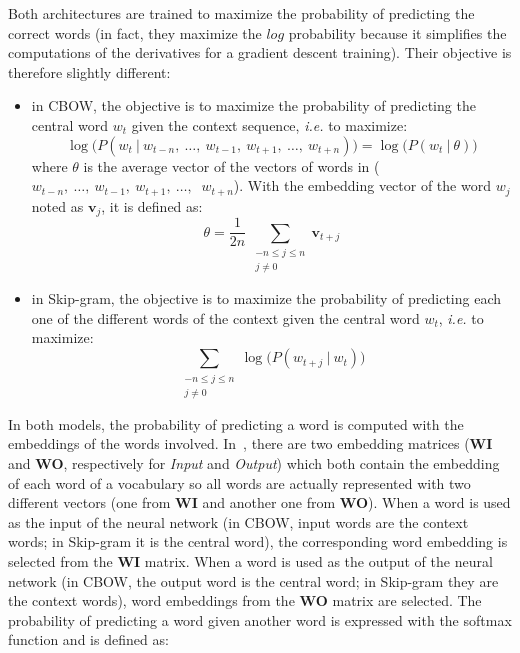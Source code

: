       \noindent Both architectures are trained to maximize the probability of
      predicting the correct words (in fact, they maximize the $log$ probability
      because it simplifies the computations of the derivatives for a gradient
      descent training). Their objective is therefore slightly different:

      \begin{itemize}
        \item in CBOW, the objective is to maximize the probability of
          predicting the central word $w_t$ given the context sequence,
          \textit{i.e.} to maximize:
          \begin{equation}
            \log\big(P(w_t~|~w_{t-n},~\dots,~w_{t-1},~w_{t+1},~\dots,~w_{t+n})\big) =
            \log\big(P(w_t~|~\theta)\big)
          \end{equation}
          where $\theta$ is the average vector of the vectors of words in
          ($w_{t-n}, ~\dots, ~w_{t-1}, ~w_{t+1}, ~\dots,$ $~w_{t+n}$). With the
          embedding vector of the word $w_j$ noted as $\mathbf{v}_j$, it is
          defined as:
          \begin{equation}
            \theta = \frac{1}{2n}
                     ~\sum_{\substack{-n \leq j \leq n \\ j \neq 0}}
                     \mathbf{v}_{t+j}
          \end{equation}
        \item in Skip-gram, the objective is to maximize the probability of
          predicting each one of the different words of the context given the
          central word $w_t$, \textit{i.e.} to maximize:
          \begin{equation}
            \sum_{\substack{-n \leq j \leq n \\ j \neq 0}}
            \log\big(P(w_{t+j}~|~w_t)\big)
          \end{equation}
      \end{itemize}

      In both models, the probability of predicting a word is computed with the
      embeddings of the words involved. In~\citep{mikolov2013efficient}, there
      are two embedding matrices (\textbf{WI} and \textbf{WO}, respectively for
      \textit{Input} and \textit{Output}) which both contain the embedding of
      each word of a vocabulary so all words are actually represented with two
      different vectors (one from \textbf{WI} and another one from \textbf{WO}).
      When a word is used as the input of the neural network (in CBOW, input
      words are the context words; in Skip-gram it is the central word), the
      corresponding word embedding is selected from the \textbf{WI} matrix. When
      a word is used as the output of the neural network (in CBOW, the output
      word is the central word; in Skip-gram they are the context words), word
      embeddings from the \textbf{WO} matrix are selected. The probability of
      predicting a word given another word is expressed with the softmax
      function and is defined as:

